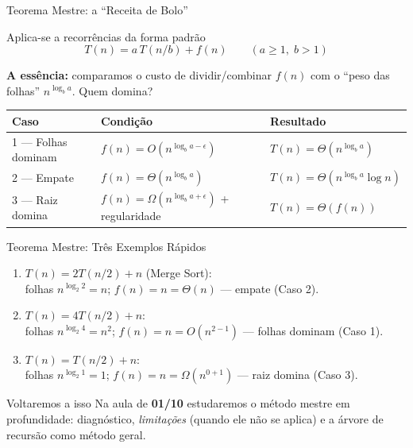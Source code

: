 \documentclass[aspectratio=169]{beamer}
\begin{document}
\begin{frame}{Teorema Mestre: a ``Receita de Bolo''}
  \begin{block}{Aplica-se a recorrências da forma padrão}
    \[
      T(n) = a\,T(n/b) + f(n) \qquad (a \ge 1,\; b > 1)
    \]
  \end{block}

  \textbf{A essência:} comparamos o custo de dividir/combinar $f(n)$ com o
  ``peso das folhas'' $n^{\log_b a}$. Quem domina?

  \begin{center}
  \renewcommand{\arraystretch}{1.4}
  \small
  \begin{tabular}{lll}
    \toprule
    \textbf{Caso} & \textbf{Condição} & \textbf{Resultado} \\
    \midrule
    1 --- Folhas dominam & $f(n) = O(n^{\log_b a - \epsilon})$ & $T(n) = \Theta(n^{\log_b a})$ \\
    2 --- Empate & $f(n) = \Theta(n^{\log_b a})$ & $T(n) = \Theta(n^{\log_b a} \log n)$ \\
    3 --- Raiz domina & $f(n) = \Omega(n^{\log_b a + \epsilon})$ {\scriptsize + regularidade} & $T(n) = \Theta(f(n))$ \\
    \bottomrule
  \end{tabular}
  \end{center}
\end{frame}

\begin{frame}{Teorema Mestre: Três Exemplos Rápidos}
  \begin{enumerate}
    \item $T(n) = 2T(n/2) + n$ (Merge Sort):\\
      folhas $n^{\log_2 2} = n$; $f(n) = n = \Theta(n)$ --- empate (Caso 2).
      \hfill{}
    \vspace{0.25cm}
    \item $T(n) = 4T(n/2) + n$:\\
      folhas $n^{\log_2 4} = n^2$; $f(n) = n = O(n^{2-1})$ --- folhas dominam (Caso 1).
      \hfill{}
    \vspace{0.25cm}
    \item $T(n) = T(n/2) + n$:\\
      folhas $n^{\log_2 1} = 1$; $f(n) = n = \Omega(n^{0+1})$ --- raiz domina (Caso 3).
      \hfill{}
  \end{enumerate}

  \vspace{0.4cm}
  \begin{block}{Voltaremos a isso}
    Na aula de \textbf{01/10} estudaremos o método mestre em profundidade:
    diagnóstico, \emph{limitações} (quando ele não se aplica) e a árvore de recursão
    como método geral.
  \end{block}
\end{frame}
\end{document}
